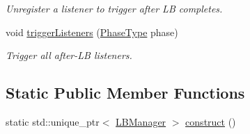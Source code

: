 \begin{DoxyCompactItemize}
\begin{DoxyCompactList}\small\item\em Unregister a listener to trigger after LB completes. \end{DoxyCompactList}\item 
void \hyperlink{structvt_1_1vrt_1_1collection_1_1balance_1_1_l_b_manager_a9baae1400676077dbe9b8f1805fab395}{trigger\+Listeners} (\hyperlink{namespacevt_a46ce6733d5cdbd735d561b7b4029f6d7}{Phase\+Type} phase)
\begin{DoxyCompactList}\small\item\em Trigger all after-\/\+LB listeners. \end{DoxyCompactList}\end{DoxyCompactItemize}
\subsection*{Static Public Member Functions}
\begin{DoxyCompactItemize}
\item 
static std\+::unique\+\_\+ptr$<$ \hyperlink{structvt_1_1vrt_1_1collection_1_1balance_1_1_l_b_manager}{L\+B\+Manager} $>$ \hyperlink{structvt_1_1vrt_1_1collection_1_1balance_1_1_l_b_manager_ae8e69a0540bb87b40ee86d2c1fe31cd5}{construct} ()
\end{DoxyCompactItemize}
